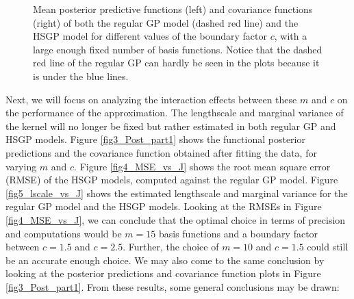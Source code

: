 \documentclass[onecolumn,a4paper,11pt]{article}
\begin{document}
\begin{figure}
\caption{Mean posterior predictive functions (left) and covariance functions (right) of both the regular GP model (dashed red line) and the HSGP model for different values of the boundary factor $c$, with a large enough fixed number of basis functions. Notice that the dashed red line of the regular GP can hardly be seen in the plots because it is under the blue lines.}
  \label{fig2_Post_L}
\end{figure}


Next, we will focus on analyzing the interaction effects between these $m$ and $c$ on the performance of the approximation. The lengthscale and marginal variance of the kernel will no longer be fixed but rather estimated in both regular GP and HSGP models. Figure \ref{fig3_Post_part1} shows the functional posterior predictions and the covariance function obtained after fitting the data, for varying $m$ and $c$. Figure \ref{fig4_MSE_vs_J} shows the root mean square error (RMSE) of the HSGP models, computed against the regular GP model. Figure \ref{fig5_lscale_vs_J} shows the estimated lengthscale and marginal variance for the regular GP model and the HSGP models. Looking at the RMSEs in Figure \ref{fig4_MSE_vs_J}, we can conclude that the optimal choice in terms of precision and computations would be $m = 15$ basis functions and a boundary factor between $c = 1.5$ and $c = 2.5$. Further, the choice of $m = 10$ and $c = 1.5$ could still be an accurate enough choice. We may also come to the same conclusion by looking at the posterior predictions and covariance function plots in Figure \ref{fig3_Post_part1}. From these results, some general conclusions may be drawn:
\end{document}
